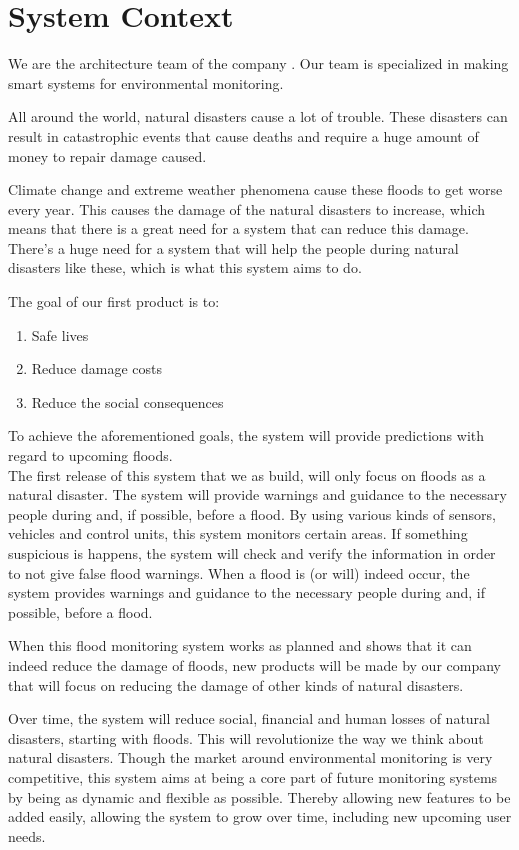 \chapter{System Context}
\label{ch:context}

We are the architecture team of the company \CompanyName. Our team is specialized in making smart systems for environmental monitoring.

All around the world, natural disasters cause a lot of trouble. These disasters can result in catastrophic events that cause deaths and require a huge amount of money to repair damage caused.

Climate change and extreme weather phenomena cause these floods to get worse every year. This causes the damage of the natural disasters to increase, which means that there is a great need for a system that can reduce this damage. There's a huge need for a system that will help the people during natural disasters like these, which is what this system aims to do.


The goal of our first product is to:
\begin{enumerate}
  \item Safe lives
  \item Reduce damage costs
  \item Reduce the social consequences
\end{enumerate}

To achieve the aforementioned goals, the system will provide predictions with regard to upcoming floods.\\

The first release of this system that we as \CompanyName build, will only focus on floods as a natural disaster. The system will provide warnings and guidance to the necessary people during and, if possible, before a flood. By using various kinds of sensors, vehicles and control units, this system monitors certain areas. If something suspicious is happens, the system will check and verify the information in order to not give false flood warnings. When a flood is (or will) indeed occur, the system   provides warnings and guidance to the necessary people during and, if possible, before a flood. 

When this flood monitoring system works as planned and shows that it can indeed reduce the damage of floods, new products will be made by our company that will focus on reducing the damage of other kinds of natural disasters.

Over time, the system will reduce social, financial and human losses of natural disasters, starting with floods. This will revolutionize the way we think about natural disasters. Though the market around environmental monitoring is very competitive, this system aims at being a core part of future monitoring systems by being as dynamic and flexible as possible. Thereby allowing new features to be added easily, allowing the system to grow over time, including new upcoming user needs.